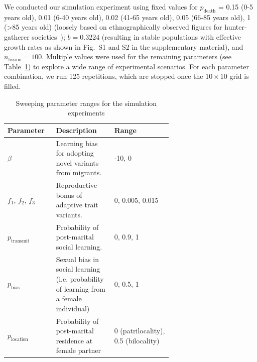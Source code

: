 \documentclass[9pt,twocolumn,twoside,lineno]{pnas-new}
\begin{document}
We conducted our simulation experiment using fixed values for $p_\text{death}$ = 0.15 (0-5 years old), 0.01 (6-40 years old), 0.02 (41-65 years old), 0.05 (66-85 years old), 1 (>85 years old) (loosely based on ethnographically observed figures for hunter-gatherer societies~\citep{burger_human_2012}); $b=0.3224$ (resulting in stable populations with effective growth rates as shown in Fig.~S1 and S2 in the supplementary material), and $n_\text{fission}=100$.
Multiple values were used for the remaining parameters (see Table~\ref{tab:sweepParameters}) to explore a wide range of experimental scenarios. 
For each parameter combination, we run 125 repetitions, which are stopped once the $10\times10$ grid is filled. 

\begin{table}%
\centering
\caption{Sweeping parameter ranges for the simulation experiments}
\begin{tabular}{p{0.15\linewidth} | p{0.3\linewidth} |  p{0.2\linewidth}}
Parameter & Description & Range \\
\midrule
$\beta$ & Learning bias for adopting novel variants from migrants. & -10, 0 \\
$f_1$, $f_2$, $f_3$ & Reproductive bonus of adaptive trait variants. & 0, 0.005, 0.015 \\
$p_\text{transmit}$ & Probability of post-marital social learning. &0, 0.9, 1 \\
$p_\text{bias}$  &Sexual bias in social learning (i.e. probability of learning from a female individual) & 0, 0.5, 1 \\
$p_\text{location}$ & Probability of post-marital residence at female partner & 0 (patrilocality), 0.5 (bilocality)
\end{tabular}
\label{tab:sweepParameters} 
\end{table}
\end{document}

